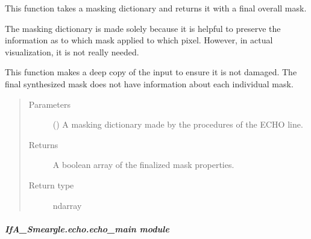 \documentclass[letterpaper,10pt,english]{sphinxmanual}
\begin{document}
\begin{fulllineitems}
\label{\detokenize{python_docstrings/IfA_Smeargle.echo.echo_functions:IfA_Smeargle.echo.echo_functions.synthesize_mask_dictionary}}
This function takes a masking dictionary and returns it with a final overall mask.

The masking dictionary is made solely because it is helpful to preserve the information as
to which mask applied to which pixel. However, in actual visualization, it is not really
needed.

This function makes a deep copy of the input to ensure it is not damaged. The final
synthesized mask does not have information about each individual mask.
\begin{quote}\begin{description}
\item[{Parameters}] \leavevmode
{} () \textendash{} A masking dictionary made by the procedures of the ECHO line.

\item[{Returns}] \leavevmode
{} \textendash{} A boolean array of the finalized mask properties.

\item[{Return type}] \leavevmode
ndarray

\end{description}\end{quote}

\end{fulllineitems}



\subparagraph{IfA\_Smeargle.echo.echo\_main module}
\label{\detokenize{python_docstrings/IfA_Smeargle.echo.echo_main:module-IfA_Smeargle.echo.echo_main}}\label{\detokenize{python_docstrings/IfA_Smeargle.echo.echo_main:ifa-smeargle-echo-echo-main-module}}\label{\detokenize{python_docstrings/IfA_Smeargle.echo.echo_main::doc}}
\end{document}
